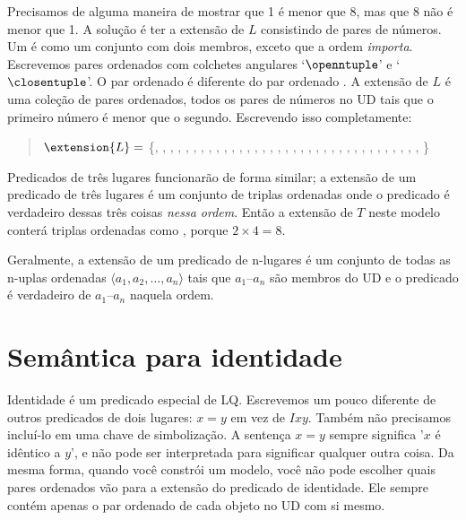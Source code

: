 Precisamos de alguma maneira de mostrar que 1 é menor que 8, mas que 8 não é menor que 1. A solução é ter a extensão de $L$ consistindo de pares de números. Um  é como um conjunto com dois membros, exceto que a ordem \emph{importa}. Escrevemos pares ordenados com colchetes angulares `$\openntuple$' e `$\closentuple$'. O par ordenado \mbox{} é diferente do par ordenado \mbox{}. A extensão de $L$ é uma coleção de pares ordenados, todos os pares de números no UD tais que o primeiro número é menor que o segundo. Escrevendo isso completamente:
\begin{quote}
$\extension{L}=$ \{, , , , , , , ,
, , , , , , ,
, , , , , ,
, , , , ,
, , , ,
, , ,
, ,
%
\}
\end{quote}

Predicados de três lugares funcionarão de forma similar; a extensão de um predicado de três lugares é um conjunto de triplas ordenadas onde o predicado é verdadeiro dessas três coisas \emph{nessa ordem}. Então a extensão de $T$ neste modelo conterá triplas ordenadas como , porque $2\times 4 = 8$.

Geralmente, a extensão de um predicado de n-lugares é um conjunto de todas as n-uplas ordenadas ${\langle}a_1, a_2,\ldots, a_n{\rangle}$ tais que $a_1$--$a_n$ são membros do UD e o predicado é verdadeiro de $a_1$--$a_n$ naquela ordem.

\section{Semântica para identidade}
Identidade é um predicado especial de LQ. Escrevemos um pouco diferente de outros predicados de dois lugares: $x=y$ em vez de $Ixy$. Também não precisamos incluí-lo em uma chave de simbolização. A sentença $x=y$ sempre significa '$x$ é idêntico a $y$', e não pode ser interpretada para significar qualquer outra coisa. Da mesma forma, quando você constrói um modelo, você não pode escolher quais pares ordenados vão para a extensão do predicado de identidade. Ele sempre contém apenas o par ordenado de cada objeto no UD com si mesmo.

